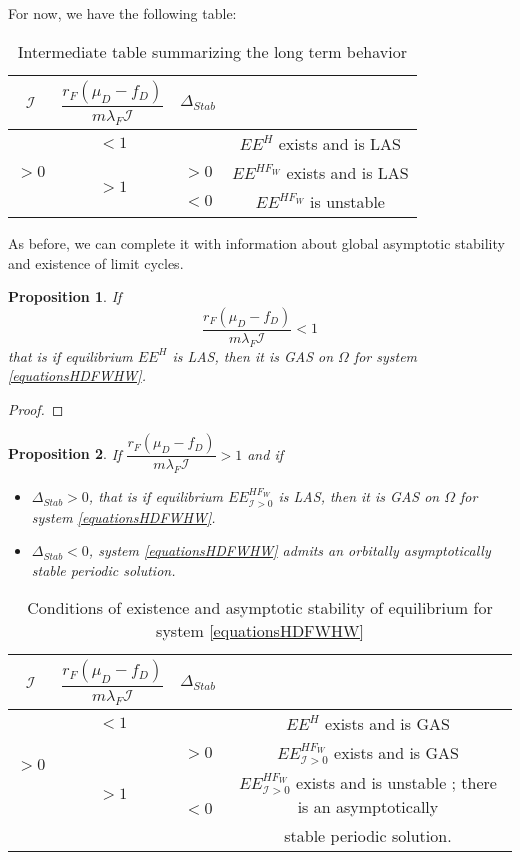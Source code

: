 \documentclass{article}
\newcommand{\lfw}{\lambda_{F}}
\newcommand{\lfw}{\lambda_{F}}
\newcommand{\cI}{\mathcal{I}}
\newtheorem{prop}{Proposition}
\begin{document}
For now, we have the following table:
\begin{table}[ht!]
\def\arraystretch{2}
\centering
\begin{tabular}{c|c|c|c}
$\cI$ & $\dfrac{r_F(\mu_D-f_D)}{m\lfw \cI} $ & $\Delta_{Stab}$ & \\
\hline
\multirow{3}{*}{$>0$} & $<1$ & &$EE^{H}$ exists and is LAS \\
\cline{2-4}
 & \multirow{2}{*}{$> 1$}  & $>0$ &$EE^{HF_W}$ exists and is LAS\\
 \cline{3-4}
 & & $ < 0$ & $EE^{HF_W}$ is unstable \\
\end{tabular}
\caption{Intermediate table summarizing the long term behavior}
\end{table}

As before, we can complete it with information about global asymptotic stability and existence of limit cycles. 

\begin{prop}
If $$\dfrac{r_F(\mu_D-f_D)}{m\lfw \cI} < 1$$
that is if equilibrium $EE^{H}$ is LAS, then it is GAS on $\Omega$ for system \eqref{equationsHDFWHW}.
\end{prop}

\begin{proof}

\end{proof}

\begin{prop}
If $\dfrac{r_F (\mu_D - f_D)}{m \lfw \cI} > 1$ and if 

\begin{itemize}
\item $\Delta_{Stab} > 0$, that is if equilibrium $EE^{HF_W}_{\cI >0}$ is LAS, then it is GAS on $\Omega$ for system \eqref{equationsHDFWHW}.
\item $\Delta_{Stab} < 0$, system \eqref{equationsHDFWHW} admits an orbitally asymptotically stable periodic solution.
\end{itemize}
\end{prop}



\begin{table}[!ht]
\def\arraystretch{2}
\centering
\begin{tabular}{c|c|c|c}
$\cI$ & $\dfrac{r_F(\mu_D-f_D)}{m\lfw \cI} $ & $\Delta_{Stab}$ & \\
\hline
\multirow{3}{*}{$>0$} & $<1$ & &$EE^{H}$ exists and is GAS \\
\cline{2-4}
 & \multirow{3}{*}{$> 1$}  & $>0$ &$EE^{HF_W}_{\cI>0}$ exists and is GAS\\
 \cline{3-4}
 & & \multirow{2}{*}{$ < 0$} & $EE^{HF_W}_{\cI>0}$ exists and is unstable ; there is an asymptotically \\
 & & &  stable periodic solution. \\
\end{tabular}
\caption{\centering Conditions of existence and asymptotic stability of equilibrium for system \eqref{equationsHDFWHW}}
\end{table}
\end{document}
